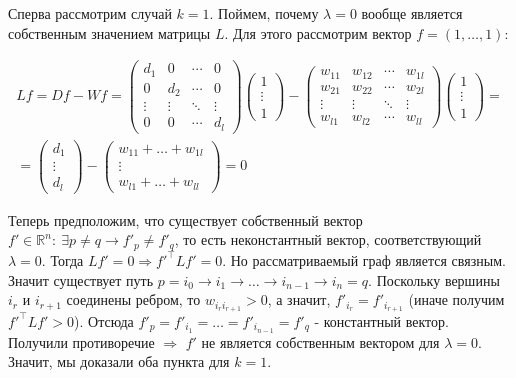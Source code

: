 \documentclass[12pt,fleqn]{article}
\begin{document}
\begin{vkProof}
Сперва рассмотрим случай $k=1$. Поймем, почему $\lambda=0$ вообще является собственным значением матрицы $L$. Для этого рассмотрим вектор $f=(1,\dots,1)$:

\begin{gather*}
L f = D f - W f =
\begin{pmatrix}
d_1&0&\cdots &0\\ 
0&d_2&\cdots &0\\
\vdots &\vdots &\ddots &\vdots \\
0&0&\cdots & d_l
\end{pmatrix}
\begin{pmatrix}
1 \\
\vdots \\
1
\end{pmatrix} - 
\begin{pmatrix}
w_{11}&w_{12}&\cdots &w_{1l}\\ 
w_{21}&w_{22}&\cdots &w_{2l}\\
\vdots &\vdots &\ddots &\vdots \\
w_{l1}&w_{l2}&\cdots & w_{ll}
\end{pmatrix}
\begin{pmatrix}
1 \\
\vdots \\
1
\end{pmatrix} = \\
= \begin{pmatrix}
d_1 \\
\vdots \\
d_l
\end{pmatrix} -
\begin{pmatrix}
w_{11} + \dots + w_{1l} \\
\vdots \\
w_{l1} + \dots + w_{ll}
\end{pmatrix} = 0
\end{gather*}

Теперь предположим, что существует собственный вектор $f'\in \mathbb R^n:\ \exists p\ne q \rightarrow f'_p \ne f'_q$, то есть неконстантный вектор, соответствующий $\lambda =0$. Тогда $Lf'=0 \Rightarrow f'^\intercal L f'=0$. Но рассматриваемый граф является связным. Значит существует путь 
$p = i_0 \rightarrow i_1 \rightarrow \dots \rightarrow i_{n-1} \rightarrow i_n = q$. Поскольку вершины $i_r$ и $i_{r+1}$ соединены ребром, то $w_{i_r i_{r+1}} > 0 $, а значит, $f'_{i_r} = f'_{i_{r+1}}$ (иначе получим $ f'^\intercal L f' > 0$). Отсюда $f'_p=f'_{i_1} = \dots = f'_{i_{n-1}}=f'_q$ - константный вектор. Получили противоречие $\Rightarrow$ $f'$ не является собственным вектором для $\lambda=0$. Значит, мы доказали оба пункта для $k=1$.


\end{vkProof}
\end{document}
